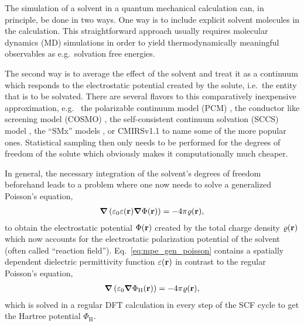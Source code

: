 The simulation of a solvent in a quantum mechanical calculation can, in principle, be done in two ways. One way is to include explicit solvent molecules in the calculation. This straightforward approach usually requires molecular dynamics (MD) simulations in order to yield thermodynamically meaningful observables as e.g.~solvation free energies.

The second way is to average the effect of the solvent and treat it as a continuum which responds to the electrostatic potential created by the solute, i.e.~the entity that is to be solvated. There are several flavors to this comparatively inexpensive approximation, e.g.~
the polarizable continuum model (PCM) \cite{Mennucci02}, 
the conductor like screening model (COSMO) \cite{Klamt93}, 
the self-consistent continuum solvation (SCCS) model \cite{Andreussi2012}, 
the ``SMx'' models \cite{Cramer2008_SM8,Marenich2009_SMD,Marenich2013_SM12}, 
or CMIRSv1.1 \cite{You2016_CMIRS11} 
to name some of the more popular ones. 
Statistical sampling then only needs to be performed for the degrees of freedom of the solute which obviously makes it computationally much cheaper. 

In general, the necessary integration of the solvent's degrees of freedom beforehand leads to a problem where one now needs to solve a generalized Poisson's equation, 
\begin{align}
{\ensuremath{\boldsymbol{\mathbf{\nabla}}}} \left( \varepsilon_0\varepsilon({\boldsymbol{\mathbf{r}}}) {\boldsymbol{\mathbf{\nabla}}} \Phi({\boldsymbol{\mathbf{r}}}) \right) = - 4\pi \varrho({\boldsymbol{\mathbf{r}}}) \label{eq:mpe_gen_poisson}, 
\end{align}
to obtain the electrostatic potential $\Phi({\boldsymbol{\mathbf{r}}})$ created by the total charge density $\varrho({\boldsymbol{\mathbf{r}}})$ which now accounts for the electrostatic polarization potential of the solvent (often called ``reaction field''). 
Eq.~\ref{eq:mpe_gen_poisson} contains a spatially dependent dielectric permittivity function $\varepsilon({\boldsymbol{\mathbf{r}}})$ in contrast to the regular Poisson's equation,
\begin{align}
{\ensuremath{\boldsymbol{\mathbf{\nabla}}}} \left( \varepsilon_0 {\boldsymbol{\mathbf{\nabla}}} \Phi_\mathrm{H}({\boldsymbol{\mathbf{r}}}) \right) = - 4\pi \varrho({\boldsymbol{\mathbf{r}}}) \label{eq:mpe_poisson}, 
\end{align}
which is solved in a regular DFT calculation in every step of the SCF cycle to get the Hartree potential $\Phi_\mathrm{H}$. 

